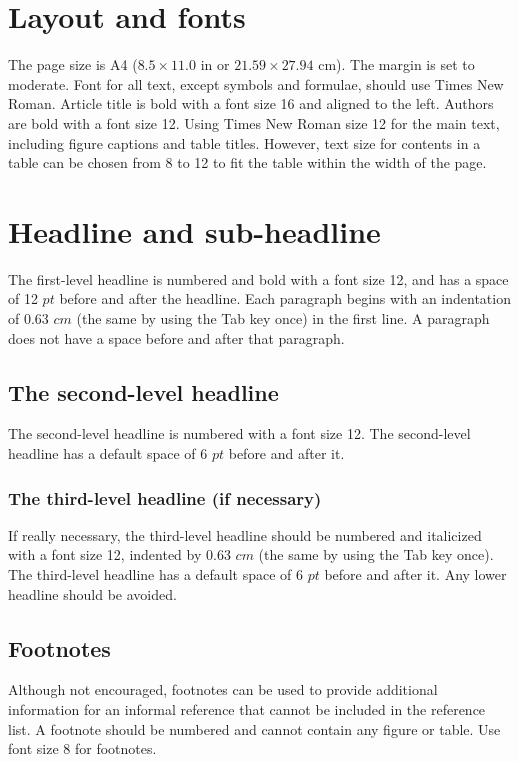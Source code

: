 \documentclass{aci}
\begin{document}
\section{Layout and fonts}
The page size is A4 ($8.5 \times 11.0$ in or $21.59 \times 27.94$ cm). The
margin is set to moderate. Font for all text, except symbols and formulae,
should use Times New Roman. Article title is bold with a font size 16 and
aligned to the left. Authors are bold with a font size 12. Using Times New Roman
size 12 for the main text, including figure captions and table titles. However,
text size for contents in a table can be chosen from 8 to 12 to fit the table
within the width of the page.

\section{Headline and sub-headline}
The first-level headline is numbered and bold with a font size 12, and has a
space of 12 $pt$ before and after the headline. Each paragraph begins with an
indentation of 0.63 $cm$ (the same by using the Tab key once) in the first line.
A paragraph does not have a space before and after that paragraph.

\subsection{The second-level headline}
The second-level headline is numbered with a font size 12. The second-level
headline has a default space of 6 $pt$ before and after it.

\subsubsection{The third-level headline (if necessary)}
If really necessary, the third-level headline should be numbered and italicized
with a font size 12, indented by 0.63 $cm$ (the same by using the Tab key once).
The third-level headline has a default space of 6 $pt$ before and after it. Any
lower headline should be avoided.

\subsection{Footnotes}
Although not encouraged, footnotes can be used to provide additional information
for an informal reference that cannot be included in the reference list. A
footnote should be numbered and cannot contain any figure or table. Use font
size 8 for footnotes.
\end{document}
